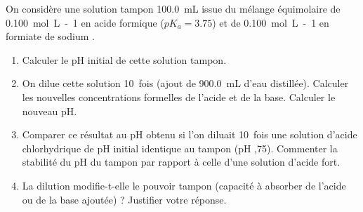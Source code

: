 \documentclass[11pt]{article}
\begin{document}
\begin{exercice}
On considère une solution tampon \SI{100,0}{mL} issue du mélange équimolaire de \SI{0,100}{mol.L-1} en acide formique  ($pK_a = \num{3,75}$) et de \SI{0,100}{mol.L-1} en formiate de sodium .
\begin{enumerate}
    \item Calculer le pH initial de cette solution tampon.
    \item On dilue cette solution \SI{10}{fois} (ajout de \SI{900,0}{mL} d'eau distillée). Calculer les nouvelles concentrations formelles de l'acide et de la base. Calculer le nouveau pH.
    \item Comparer ce résultat au pH obtenu si l'on diluait \SI{10}{fois} une solution d'acide chlorhydrique de pH initial identique au tampon (pH ,75). Commenter la stabilité du pH du tampon par rapport à celle d'une solution d'acide fort.
    \item La dilution modifie-t-elle le pouvoir tampon (capacité à absorber de l'acide ou de la base ajoutée) ? Justifier votre réponse.
\end{enumerate}
\end{exercice}
\end{document}
